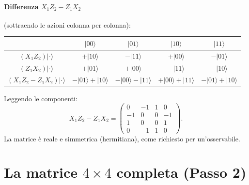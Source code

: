 \documentclass[11pt,a4paper]{article}
\newcommand{\ket}[1]{\lvert #1 \rangle}
\theoremstyle{definition}
\begin{document}
\paragraph{Differenza $X_1Z_2-Z_1X_2$} (sottraendo le azioni colonna per colonna):

\medskip
\begin{center}
\renewcommand{\arraystretch}{1.25}
\begin{tabular}{c|cccc}
 & $\ket{00}$ & $\ket{01}$ & $\ket{10}$ & $\ket{11}$ \\
\hline
$(X_1Z_2)\ket{\cdot}$ & $+\ket{10}$ & $-\ket{11}$ & $+\ket{00}$ & $-\ket{01}$ \\
$(Z_1X_2)\ket{\cdot}$ & $+\ket{01}$ & $+\ket{00}$ & $-\ket{11}$ & $-\ket{10}$ \\[2pt]
$(X_1Z_2-Z_1X_2)\ket{\cdot}$ & $-\ket{01}+\ket{10}$ & $-\ket{00}-\ket{11}$ & $+\ket{00}+\ket{11}$ & $-\ket{01}+\ket{10}$ \\
\end{tabular}
\end{center}
\medskip

Leggendo le componenti:
\begin{equation}
X_1Z_2-Z_1X_2=\begin{pmatrix}0&-1&1&0\\-1&0&0&-1\\1&0&0&1\\0&-1&1&0\end{pmatrix}.
\label{eq:DM4x4}
\end{equation}
La matrice è reale e simmetrica (hermitiana), come richiesto per un'osservabile.

\FloatBarrier
\section{La matrice $4\times4$ completa (Passo 2)}
\end{document}
